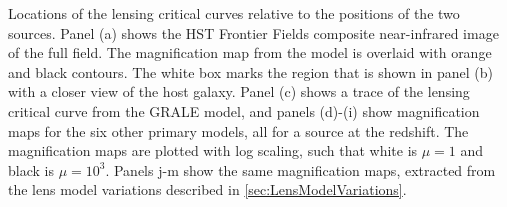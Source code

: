 \label{fig:SpockCriticalCurves}
Locations of the lensing critical curves relative to the positions of
the two \spock sources. Panel (a) shows the HST Frontier Fields
composite near-infrared image of the full  field.  The
magnification map from the \citet{Caminha:2017} model is overlaid with
orange and black contours.  The white box marks the region that is
shown in panel (b) with a closer view of the \spock host galaxy.
Panel (c) shows a trace of the lensing critical curve from the GRALE
model, and panels (d)-(i) show magnification maps for the six other
primary models, all for a source at the \spock redshift.  The
magnification maps are plotted with log scaling, such that white is
$\mu=1$ and black is $\mu=10^3$.  Panels j-m show the same
magnification maps, extracted from the lens model variations described
in \ref{sec:LensModelVariations}.
